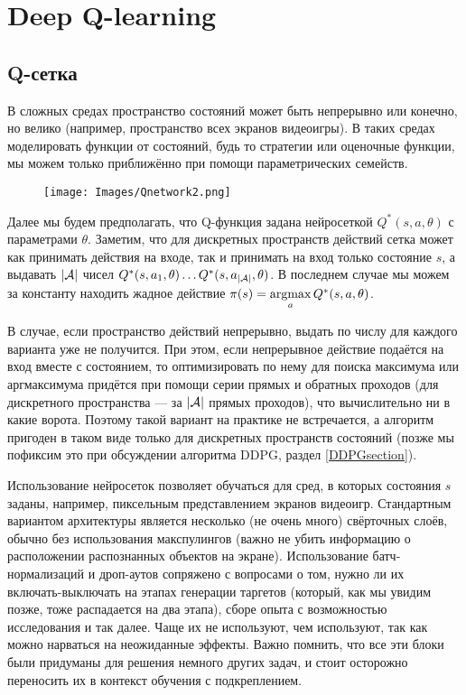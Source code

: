 \section{Deep Q-learning}

\subsection{Q-сетка}

В сложных средах пространство состояний может быть непрерывно или конечно, но велико (например, пространство всех экранов видеоигры). В таких средах моделировать функции от состояний, будь то стратегии или оценочные функции, мы можем только приближённо при помощи параметрических семейств.

\begin{wrapfigure}{r}{0.35\textwidth}
\vspace{-0.3cm}
\centering
\texttt{[image: Images/Qnetwork2.png]}
\vspace{-0.3cm}
\end{wrapfigure}

Далее мы будем предполагать, что Q-функция задана нейросеткой $Q^*(s, a, \theta)$ с параметрами $\theta$. Заметим, что для дискретных пространств действий сетка может как принимать действия на входе, так и принимать на вход только состояние $s$, а выдавать $|\mathcal{A}|$ чисел $Q^*(s, a_1, \theta) \dots Q^*(s, a_{|\mathcal{A}|}, \theta)$. В последнем случае мы можем за константу находить жадное действие $\pi(s) = \mathop{\mathrm{argmax}}\limits_a Q^*(s, a, \theta)$.

В случае, если пространство действий непрерывно, выдать по числу для каждого варианта уже не получится. При этом, если непрерывное действие подаётся на вход вместе с состоянием, то оптимизировать по нему для поиска максимума или аргмаксимума придётся при помощи серии прямых и обратных проходов (для дискретного пространства --- за $|\mathcal{A}|$ прямых проходов), что вычислительно ни в какие ворота. Поэтому такой вариант на практике не встречается, а алгоритм пригоден в таком виде только для дискретных пространств состояний (позже мы пофиксим это при обсуждении алгоритма DDPG, раздел \ref{DDPGsection}).

\begin{remark}
Использование нейросеток позволяет обучаться для сред, в которых состояния $s$ заданы, например, пиксельным представлением экранов видеоигр. Стандартным вариантом архитектуры является несколько (не очень много) свёрточных слоёв, обычно без использования макспулингов (важно не убить информацию о расположении распознанных объектов на экране). Использование батч-нормализаций и дроп-аутов сопряжено с вопросами о том, нужно ли их включать-выключать на этапах генерации таргетов (который, как мы увидим позже, тоже распадается на два этапа), сборе опыта с возможностью исследования и так далее. Чаще их не используют, чем используют, так как можно нарваться на неожиданные эффекты. Важно помнить, что все эти блоки были придуманы для решения немного других задач, и стоит осторожно переносить их в контекст обучения с подкреплением.
\end{remark}

